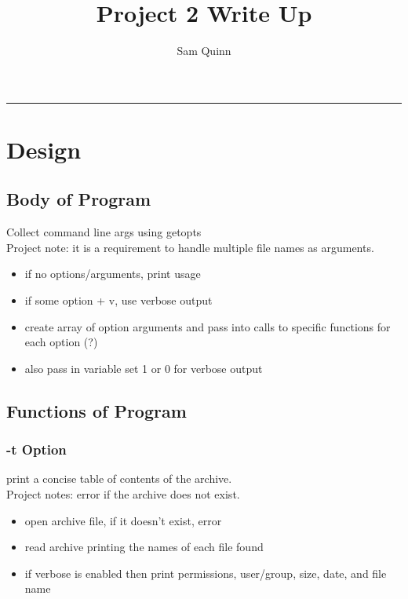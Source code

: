 \documentclass[letterpaper,10pt,notitlepage,fleqn]{article}
\title{Project 2 Write Up}
\author{Sam Quinn}
\begin{document}
\maketitle
\hrule

\section*{Design}

\subsection*{Body of Program}
Collect command line args using getopts\\
Project note: it is a requirement to handle multiple file names as arguments.

\begin{itemize} 
\item if no options/arguments, print usage
\item if some option + v, use verbose output
\item create array of option arguments and pass into calls to specific functions for each option (?)
\item also pass in variable set 1 or 0 for verbose output
\end{itemize}

\subsection*{Functions of Program}

\subsubsection*{-t Option}
print a concise table of contents of the archive.\\
Project notes: error if the archive does not exist.


\begin{itemize}
\item open archive file, if it doesn't exist, error
\item read archive printing the names of each file found
\item if verbose is enabled then print permissions, user/group, size, date, and file name 
\end{itemize}
\end{document}

